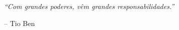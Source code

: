 \vspace*{15cm}

\epigraph{\it ``Com grandes poderes, vêm grandes responsabilidades.''}{-- Tio Ben}

\cleardoublepage